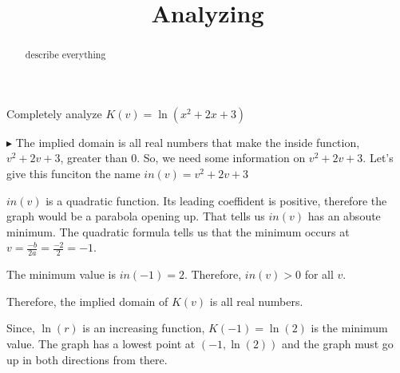 \documentclass{ximera}
\title{Analyzing}
\begin{document}
\begin{abstract}
describe everything
\end{abstract}
\maketitle







Completely analyze $K(v) = \ln(x^2+2x+3)$

$\blacktriangleright$  The implied domain is all real numbers that make the inside function, $v^2+2v+3$, greater than $0$.  So, we need some information on $v^2+2v+3$.   Let's give this funciton the name $in(v) = v^2+2v+3$

$in(v)$ is a quadratic function.  Its leading coeffident is positive, therefore the graph would be a parabola opening up.  That tells us $in(v)$ has an absoute minimum.  The quadratic formula tells us that the minimum occurs at $v=\frac{-b}{2a} = \frac{-2}{2} = -1$.

The minimum value is $in(-1) = 2$.  Therefore, $in(v) > 0$ for all $v$.

Therefore, the implied domain of $K(v)$ is all real numbers.

Since, $\ln(r)$ is an increasing function, $K(-1) = \ln(2)$ is the minimum value.  The graph has a lowest point at $(-1, \ln(2))$ and the graph must go up in both directions from there.
\end{document}
